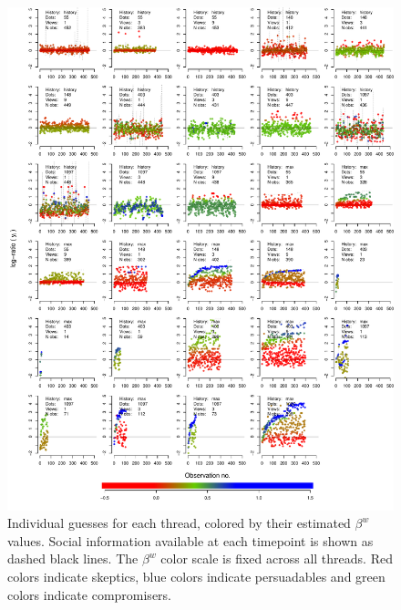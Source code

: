 \documentclass[9pt,a4paper,twocolumn,lineno]{article}
\begin{document}
\begin{figure}%
\centering
	\hspace{-30px}\includegraphics[width=1\linewidth]{allthreads}
	\caption{Individual guesses for each thread, colored by their estimated $\beta^w$ values. Social information available at each timepoint is shown as dashed black lines. The $\beta^w$ color scale is fixed across all threads. Red colors indicate skeptics, blue colors indicate persuadables and green colors indicate compromisers.}\label{fig: threads with social info and colored by beta weights}
\end{figure}
\newpage
\end{document}
